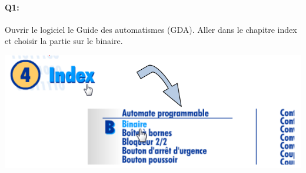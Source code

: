 \documentclass{article}
\begin{document}
\paragraph{Q1:}
Ouvrir le logiciel \og{}le Guide des automatismes\fg{} (GDA).
Aller dans le chapitre \og{}index\fg{} et choisir la partie sur le binaire.

\begin{center}
	\includegraphics[width=.7\linewidth]{./figures/gda1.png}
\end{center}
\end{document}
